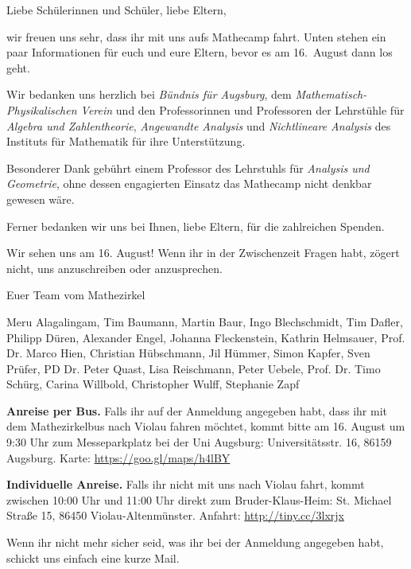 \documentclass[12pt]{zettel}
\begin{document}
\renewcommand{\betreff}{Mathecamp des Matheschülerzirkels Augsburg}

\makeletterhead{}
\vspace{-2em}

Liebe Schülerinnen und Schüler, liebe Eltern,

wir freuen uns sehr, dass ihr mit uns aufs Mathecamp
fahrt. Unten stehen ein paar Informationen für euch und eure Eltern, bevor es
am 16.~August dann los geht.

Wir bedanken uns herzlich bei \emph{Bündnis für Augsburg}, dem
\emph{Mathematisch-Physikalischen Verein} und den Professorinnen und
Professoren der Lehrstühle für \emph{Algebra und Zahlentheorie},
\emph{Angewandte Analysis} und \emph{Nichtlineare Analysis} des Instituts für
Mathematik für ihre Unterstützung.

Besonderer Dank gebührt einem Professor des
Lehrstuhls für \emph{Analysis und Geometrie}, ohne dessen engagierten Einsatz
das Mathecamp nicht denkbar gewesen wäre.

Ferner bedanken wir uns bei Ihnen, liebe Eltern, für die zahlreichen
Spenden.

Wir sehen uns am 16. August! Wenn ihr in der Zwischenzeit Fragen habt, zögert
nicht, uns anzuschreiben oder anzusprechen.

\vspace{1em}

Euer Team vom Mathezirkel


{\small Meru Alagalingam, Tim Baumann, Martin Baur, Ingo Blechschmidt, Tim
Dafler, Philipp Düren, Alexander Engel, Johanna Fleckenstein, Kathrin
Helmsauer, Prof. Dr. Marco Hien, Christian Hübschmann, Jil Hümmer, Simon
Kapfer, Sven Prüfer, PD Dr. Peter Quast, Lisa Reischmann, Peter Uebele, Prof.
Dr. Timo Schürg, Carina Willbold, Christopher Wulff, Stephanie Zapf}

\begin{shaded}
\textbf{Anreise per Bus.} Falls ihr auf der Anmeldung angegeben habt, dass ihr mit dem
Mathezirkelbus nach Violau fahren möchtet, kommt bitte am 16. August um
9:30 Uhr zum Messeparkplatz bei der Uni Augsburg: Universitätsstr. 16, 86159
Augsburg. Karte: \url{https://goo.gl/maps/h4lBY}

\textbf{Individuelle Anreise.} Falls ihr nicht mit uns nach Violau fahrt, kommt
zwischen 10:00 Uhr und 11:00 Uhr direkt zum Bruder-Klaus-Heim:
St. Michael Straße 15, 86450 Violau-Altenmünster. Anfahrt:
\url{http://tiny.cc/3lxrjx}

Wenn ihr nicht mehr sicher seid, was ihr bei der Anmeldung angegeben habt,
schickt uns einfach eine kurze Mail.
\end{shaded}
\end{document}
